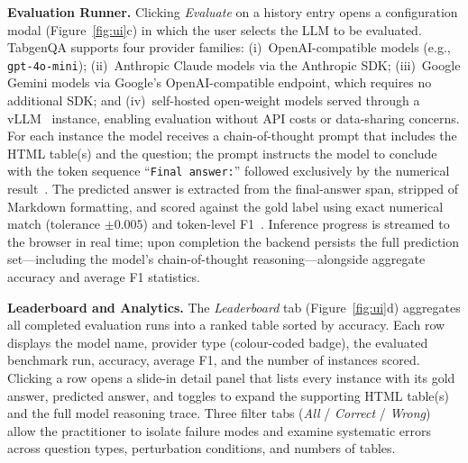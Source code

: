 \smallskip\noindent\textbf{Evaluation Runner.}
Clicking \emph{Evaluate} on a history entry opens a configuration modal
(Figure~\ref{fig:ui}c) in which the user selects the LLM to be evaluated.
TabgenQA supports four provider families:
(i)~OpenAI-compatible models (e.g., \texttt{gpt-4o-mini});
(ii)~Anthropic Claude models via the Anthropic SDK;
(iii)~Google Gemini models via Google's OpenAI-compatible endpoint, which
  requires no additional SDK; and
(iv)~self-hosted open-weight models served through a
  vLLM~\cite{kwon2023vllm} instance, enabling evaluation without API
  costs or data-sharing concerns.
For each instance the model receives a chain-of-thought prompt that
includes the HTML table(s) and the question; the prompt instructs the
model to conclude with the token sequence ``\texttt{Final answer:}''
followed exclusively by the numerical result~\cite{wei2022chain}.
The predicted answer is extracted from the final-answer span, stripped of
Markdown formatting, and scored against the gold label using
exact numerical match (tolerance $\pm 0.005$) and token-level
F1~\cite{rajpurkar-etal-2016-squad}.
Inference progress is streamed to the browser in real time; upon
completion the backend persists the full prediction set—including the
model's chain-of-thought reasoning—alongside aggregate accuracy and
average F1 statistics.

\smallskip\noindent\textbf{Leaderboard and Analytics.}
The \emph{Leaderboard} tab (Figure~\ref{fig:ui}d) aggregates all
completed evaluation runs into a ranked table sorted by accuracy.
Each row displays the model name, provider type (colour-coded badge), the
evaluated benchmark run, accuracy, average F1, and the number of
instances scored.
Clicking a row opens a slide-in detail panel that lists every instance
with its gold answer, predicted answer, and toggles to expand the
supporting HTML table(s) and the full model reasoning trace.
Three filter tabs (\emph{All} / \emph{Correct} / \emph{Wrong}) allow the
practitioner to isolate failure modes and examine systematic errors across
question types, perturbation conditions, and numbers of tables.

